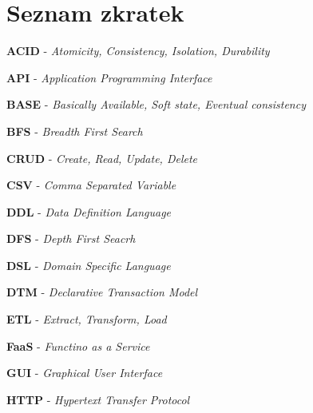 \documentclass[11pt,twoside,a4paper]{book}
\begin{document}
	\tableofcontents		%

	\listoffigures			%
	\listoftables			%
	\lstlistoflistings         %

	\mainbodystarts











{
\def\CS{$\cal C\kern-0.1667em\lower.5ex\hbox{$\cal S$}\kern-0.075em $}

}

\appendix

\chapter{Seznam zkratek}
\printnomenclature
\label{apx:zkratky}

\textbf{ACID} - \textit{Atomicity, Consistency, Isolation, Durability}

\textbf{API} - \textit{Application Programming Interface}

\textbf{BASE} - \textit{Basically Available, Soft state, Eventual consistency}

\textbf{BFS} - \textit{Breadth First Search}

\textbf{CRUD} - \textit{Create, Read, Update, Delete}

\textbf{CSV} - \textit{Comma Separated Variable}

\textbf{DDL} - \textit{Data Definition Language}

\textbf{DFS} - \textit{Depth First Seacrh}

\textbf{DSL} - \textit{Domain Specific Language}

\textbf{DTM} - \textit{Declarative Transaction Model}

\textbf{ETL} - \textit{Extract, Transform, Load}

\textbf{FaaS} - \textit{Functino as a Service}

\textbf{GUI} - \textit{Graphical User Interface}

\textbf{HTTP} - \textit{Hypertext Transfer Protocol}
\end{document}
